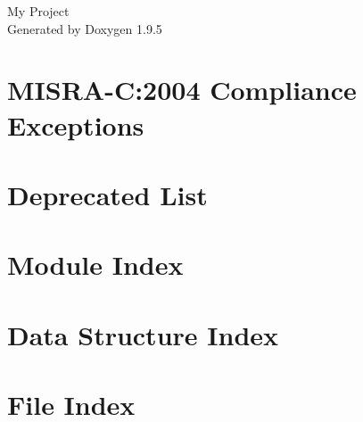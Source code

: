 \documentclass[twoside]{book}
\newcommand{\+}{\discretionary{\mbox{\scriptsize$\hookleftarrow$}}{}{}}
\newcommand{\clearemptydoublepage}{%
    \newpage{\pagestyle{empty}\cleardoublepage}%
  }
\begin{document}
  \raggedbottom
    \hypersetup{pageanchor=false,
                bookmarksnumbered=true,
                pdfencoding=unicode
               }
  \begin{titlepage}
  \vspace*{7cm}
  \begin{center}%
  {\Large My Project}\\
  \vspace*{1cm}
  {\large Generated by Doxygen 1.9.5}\\
  \end{center}
  \end{titlepage}
  \clearemptydoublepage
  \tableofcontents
  \clearemptydoublepage
  \hypersetup{pageanchor=true}
\chapter{MISRA-\/C\+:2004 Compliance Exceptions}
\label{_c_m_s_i_s__m_i_s_r_a__exceptions}

\chapter{Deprecated List}
\label{deprecated}

\chapter{Module Index}

\chapter{Data Structure Index}

\chapter{File Index}

\end{document}
